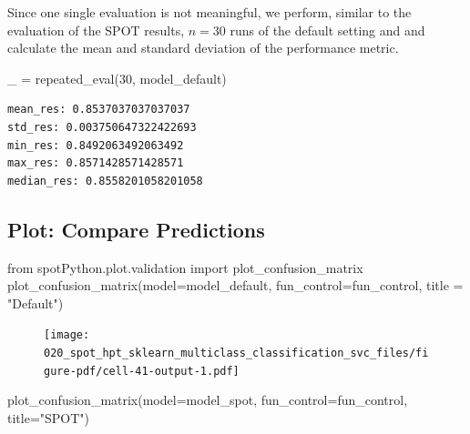 \documentclass[
  letterpaper,
  DIV=11,
  numbers=noendperiod]{scrreprt}
\newenvironment{Shaded}{\begin{snugshade}}{\end{snugshade}}
\newcommand{\DecValTok}[1]{\textcolor[rgb]{0.68,0.00,0.00}{#1}}
\newcommand{\ImportTok}[1]{\textcolor[rgb]{0.00,0.46,0.62}{#1}}
\newcommand{\NormalTok}[1]{\textcolor[rgb]{0.00,0.23,0.31}{#1}}
\newcommand{\OperatorTok}[1]{\textcolor[rgb]{0.37,0.37,0.37}{#1}}
\newcommand{\StringTok}[1]{\textcolor[rgb]{0.13,0.47,0.30}{#1}}
\begin{document}
Since one single evaluation is not meaningful, we perform, similar to
the evaluation of the SPOT results, \(n=30\) runs of the default setting
and and calculate the mean and standard deviation of the performance
metric.

\begin{Shaded}
\begin{Highlighting}[]
\NormalTok{\_ }\OperatorTok{=}\NormalTok{ repeated\_eval(}\DecValTok{30}\NormalTok{, model\_default)}
\end{Highlighting}
\end{Shaded}

\begin{verbatim}
mean_res: 0.8537037037037037
std_res: 0.003750647322422693
min_res: 0.8492063492063492
max_res: 0.8571428571428571
median_res: 0.8558201058201058
\end{verbatim}

\hypertarget{plot-compare-predictions-3}{%
\subsection{Plot: Compare
Predictions}\label{plot-compare-predictions-3}}

\begin{Shaded}
\begin{Highlighting}[]
\ImportTok{from}\NormalTok{ spotPython.plot.validation }\ImportTok{import}\NormalTok{ plot\_confusion\_matrix}
\NormalTok{plot\_confusion\_matrix(model}\OperatorTok{=}\NormalTok{model\_default, fun\_control}\OperatorTok{=}\NormalTok{fun\_control, title }\OperatorTok{=} \StringTok{"Default"}\NormalTok{)}
\end{Highlighting}
\end{Shaded}

\begin{figure}[H]

{\centering \texttt{[image: 020\_spot\_hpt\_sklearn\_multiclass\_classification\_svc\_files/figure-pdf/cell-41-output-1.pdf]}

}

\end{figure}

\begin{Shaded}
\begin{Highlighting}[]
\NormalTok{plot\_confusion\_matrix(model}\OperatorTok{=}\NormalTok{model\_spot, fun\_control}\OperatorTok{=}\NormalTok{fun\_control, title}\OperatorTok{=}\StringTok{"SPOT"}\NormalTok{)}
\end{Highlighting}
\end{Shaded}
\end{document}
